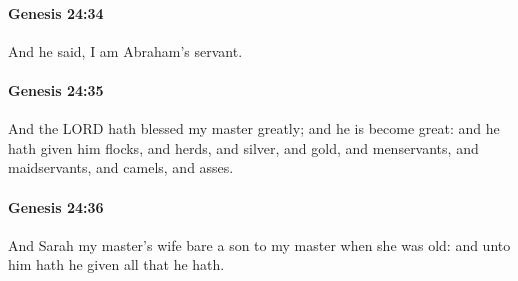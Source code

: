		\paragraph{Genesis 24:34} %
			\label{GENESIS-24-34}

			And he said, I am Abraham's servant.


		\paragraph{Genesis 24:35} %
			\label{GENESIS-24-35}

			And the LORD hath blessed my master greatly; and he is become great: and he hath given him flocks, and herds, and silver, and gold, and menservants, and maidservants, and camels, and asses.


		\paragraph{Genesis 24:36} %
			\label{GENESIS-24-36}

			And Sarah my master's wife bare a son to my master when she was old: and unto him hath he given all that he hath.



